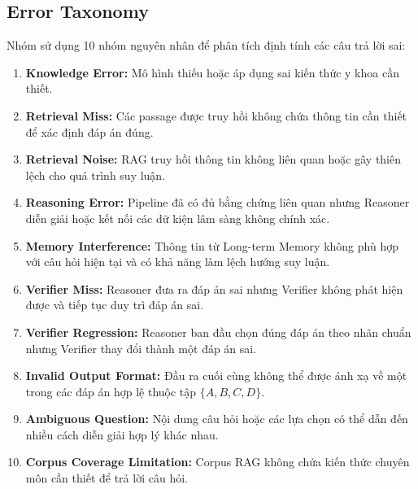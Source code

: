 \subsection{Error Taxonomy}

Nhóm sử dụng 10 nhóm nguyên nhân để phân tích định tính các câu trả
lời sai:

\begin{enumerate}
    \item \textbf{Knowledge Error:}
    Mô hình thiếu hoặc áp dụng sai kiến thức y khoa cần thiết.

    \item \textbf{Retrieval Miss:}
    Các passage được truy hồi không chứa thông tin cần thiết để xác
    định đáp án đúng.

    \item \textbf{Retrieval Noise:}
    RAG truy hồi thông tin không liên quan hoặc gây thiên lệch cho
    quá trình suy luận.

    \item \textbf{Reasoning Error:}
    Pipeline đã có đủ bằng chứng liên quan nhưng Reasoner diễn giải
    hoặc kết nối các dữ kiện lâm sàng không chính xác.

    \item \textbf{Memory Interference:}
    Thông tin từ Long-term Memory không phù hợp với câu hỏi hiện tại
    và có khả năng làm lệch hướng suy luận.

    \item \textbf{Verifier Miss:}
    Reasoner đưa ra đáp án sai nhưng Verifier không phát hiện được
    và tiếp tục duy trì đáp án sai.

    \item \textbf{Verifier Regression:}
    Reasoner ban đầu chọn đúng đáp án theo nhãn chuẩn nhưng Verifier
    thay đổi thành một đáp án sai.

    \item \textbf{Invalid Output Format:}
    Đầu ra cuối cùng không thể được ánh xạ về một trong các đáp án
    hợp lệ thuộc tập $\{A,B,C,D\}$.

    \item \textbf{Ambiguous Question:}
    Nội dung câu hỏi hoặc các lựa chọn có thể dẫn đến nhiều cách
    diễn giải hợp lý khác nhau.

    \item \textbf{Corpus Coverage Limitation:}
    Corpus RAG không chứa kiến thức chuyên môn cần thiết để trả lời
    câu hỏi.
\end{enumerate}

